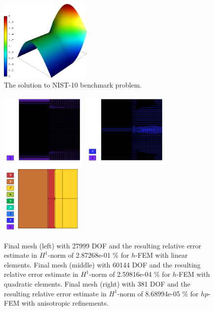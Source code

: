 \documentclass[12pt]{elsarticle}
\begin{document}
\begin{figure}[H]
\centering
\vspace{-5mm}
\includegraphics[height=4cm]{nist/nist-10/solution.png}
\vspace{-5mm}
\caption{The solution to NIST-10 benchmark problem.}
\vspace{-5mm}
\label{fig:sln-nist10}
\end{figure}

\begin{figure}[H]
\centering
\vspace{-5mm}
\includegraphics[height=3.6cm]{nist/nist-10/mesh_h1_aniso.png}
\includegraphics[height=3.6cm]{nist/nist-10/mesh_h2_aniso.png}
\includegraphics[height=3.6cm]{nist/nist-10/mesh_hp_aniso.png}
\vspace{-5mm}
\caption{
Final mesh (left) with 27999 DOF and the resulting
relative error estimate in $H^1$-norm of 2.87268e-01 \% for $h$-FEM with linear elements.
Final mesh (middle) with 60144 DOF and the resulting
relative error estimate in $H^1$-norm of 2.59816e-04 \% for $h$-FEM with quadratic elements.
Final mesh (right) with 381 DOF and the resulting
relative error estimate in $H^1$-norm of 8.68994e-05 \% for $hp$-FEM with anisotropic refinements.}
\vspace{-5mm}
\label{fig:nist-10-hp-aniso}
\end{figure}
\end{document}
